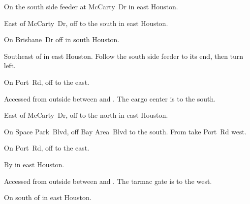 
\begin{LocationList}

On the south side  feeder at McCarty~Dr in east Houston.

\Location{\GarageHQ \Garage}
East of McCarty~Dr, off  to the south in east Houston.

On Brisbane~Dr off  in south Houston.

Southeast of   in east Houston.
Follow the south side feeder to its end, then turn left.

On Port~Rd, off  to the east.

Accessed from  outside  between  and .
The cargo center is to the south.

\Location{\RecruitmentAgency \Recruitment}
East of McCarty~Dr, off  to the north in east Houston.

On Space Park~Blvd, off Bay Area~Blvd to the south.
From  take Port~Rd west.

On Port~Rd, off  to the east.

\Location{\TruckStop \Gas \Rest \Weigh}
By   in east Houston.

Accessed from  outside  between  and .
The tarmac gate is to the west.

On  south of  in east Houston.

\end{LocationList}
